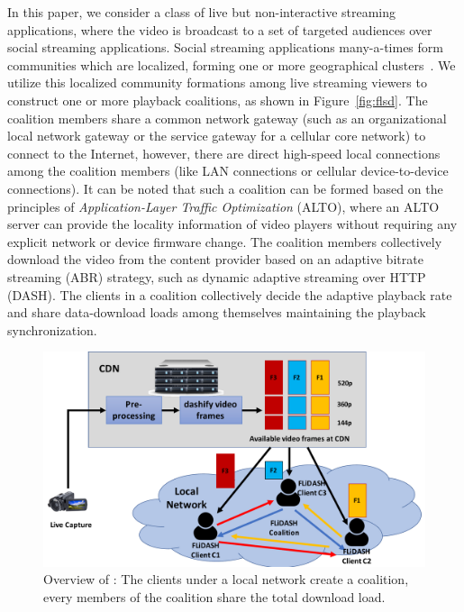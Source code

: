In this paper, we consider a class of live but non-interactive streaming applications, where the video is broadcast to a set of targeted audiences over social streaming applications. Social streaming applications many-a-times form communities which are localized, forming one or more geographical clusters~\cite{wang2016anatomy}. We utilize this localized community formations among live streaming viewers to construct one or more playback coalitions, as shown in Figure~\ref{fig:flsd}. The coalition members share a common network gateway (such as an organizational local network gateway or the service gateway for a cellular core network) to connect to the Internet, however, there are direct high-speed local connections among the coalition members (like LAN connections or cellular device-to-device connections). It can be noted that such a coalition can be formed based on the principles of \textit{Application-Layer Traffic Optimization} (ALTO), where an ALTO server can provide the locality information of video players without requiring any explicit network or device firmware change. The coalition members collectively download the video from the content provider based on an adaptive bitrate streaming (ABR) strategy, such as dynamic adaptive streaming over HTTP (DASH).  The clients in a coalition collectively decide the adaptive playback rate and share data-download loads among themselves maintaining the playback synchronization. 
\begin{figure}[!ht]
    \centering
    \includegraphics[width=0.8\linewidth]{img/flsd.pdf}
    \caption{Overview of \our: The clients under a local network create a coalition, every members of the coalition share the total download load.}
    \label{fig:chap06:flsd}
\end{figure}

